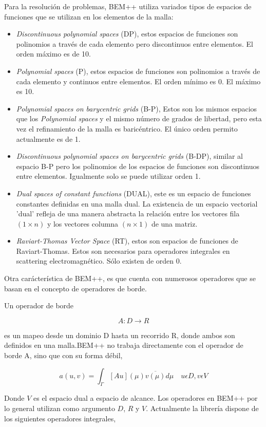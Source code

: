 \documentclass[12pt,letterpaper]{report}
\numberwithin{equation}{section}
\begin{document}
Para la resolución de problemas, BEM++ utiliza variados tipos de espacios de funciones que se utilizan en los elementos de la malla:

\begin{itemize}
	\item \textit{Discontinuous polynomial spaces} (DP), estos espacios de funciones son polinomios a través de cada elemento pero discontinuos entre elementos. El orden máximo es de 10.
	\item \textit{Polynomial spaces} (P), estos espacios de funciones son polinomios a través de cada elemento y continuos entre elementos. El orden mínimo es 0. El máximo es 10.
	\item \textit{Polynomial spaces on barycentric grids} (B-P), Estos son los mismos espacios que los \textit{Polynomial spaces} y el mismo número de grados de libertad, pero esta vez el refinamiento de la malla es baricéntrico. El único orden permito actualmente es de 1.
	\item \textit{Discontinuous polynomial spaces on barycentric grids} (B-DP), similar al espacio B-P pero los polinomios de los espacios de funciones son discontinuos entre elementos. Igualmente solo se puede utilizar orden 1.
	\item \textit{Dual spaces of constant functions} (DUAL), este es un espacio de funciones constantes definidas en una malla dual. La existencia de un espacio vectorial 'dual' refleja de una manera abstracta la relación entre los vectores fila $(1 \times n)$ y los vectores columna $(n \times 1)$ de una matriz. 
	\item \textit{Raviart-Thomas Vector Space} (RT), estos son espacios de funciones de Raviart-Thomas. Estos son necesarios para operadores integrales en scattering electromagnético. Sólo existen de orden 0.
\end{itemize}


Otra carácterística de BEM++, es que cuenta con numerosos operadores que se basan en el concepto de operadores de borde.

Un operador de borde

$$A\colon D\rightarrow R$$

es un mapeo desde un dominio D hasta un recorrido R, donde ambos son definidos en una malla.BEM++ no trabaja directamente con el operador de borde A, sino que con su forma débil,

$$a(u,v)=\int_{\Gamma}\left[ Au\right](\mu) \overline{v(\mu)} d\mu \quad u\epsilon D,v\epsilon V $$

\noindent Donde $V$ es el espacio dual a espacio de alcance. Los operadores en BEM++ por lo general utilizan como argumento $D$, $R$ y $V$. Actualmente la librería dispone de los siguientes operadores integrales,
\end{document}
